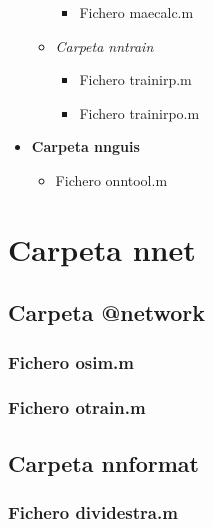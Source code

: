 \begin{itemize}
\begin{itemize}
\begin{itemize}
				\item Fichero maecalc.m
			\end{itemize}
			\item \textit{Carpeta nntrain}
			\begin{itemize}
				\item Fichero trainirp.m
				\item Fichero trainirpo.m
			\end{itemize}
		\end{itemize}
		\item \textbf{Carpeta nnguis}
		\begin{itemize}
			\item Fichero onntool.m
		\end{itemize}
	\end{itemize}
	
	\section{Carpeta nnet}
		
		\subsection{Carpeta @network}
		
			\subsubsection{Fichero osim.m}
			
			
			
			\subsubsection{Fichero otrain.m}
			
			
			
		\subsection{Carpeta nnformat}
		
			\subsubsection{Fichero dividestra.m}
			
			
			
